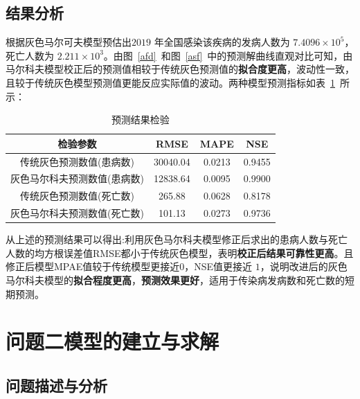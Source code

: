 \documentclass{whutmod}
\begin{document}
   \subsection{结果分析}


	根据灰色马尔可夫模型预估出$ 2019$ 年全国感染该疾病的发病人数为 $7.4096\times  10^{5}$，死亡人数为 $2.211\times  10^{3}
	$。由图~\ref{afd}~和图~\ref{asf}~中的预测解曲线直观对比可知，由马尔科夫模型校正后的预测值相较于传统灰色预测值的\textbf{拟合度更高}，波动性一致，且较于传统灰色模型预测值更能反应实际值的波动。两种模型预测指标如表~\ref{jjj}~所示：

 \begin{table}[H]
	\centering\caption{预测结果检验}\label{jjj}
	\begin{tabular}{cccc}
		\toprule[1.5pt]
		\multicolumn{1}{m{6cm}}{\centering 检验参数}
		& \multicolumn{1}{m{2cm}}{\centering RMSE}
		& \multicolumn{1}{m{2cm}}{\centering MAPE}
		& \multicolumn{1}{m{2cm}}{\centering NSE}
		\\
			\midrule[0.5pt]	
	    传统灰色预测数值(患病数) &   30040.04 &  0.0213 & 0.9455\\ 
		灰色马尔科夫预测数值(患病数)&  12838.64  &  0.0095  &  0.9900 \\ 
		传统灰色预测数值(死亡数) &  265.88   & 0.0628   &0.8178  \\
		灰色马尔科夫预测数值(死亡数) &   101.13 &   0.0273 & 0.9736  \\   
		\bottomrule[1.5pt]	
	\end{tabular}
\end{table} 

从上述的预测结果可以得出:利用灰色马尔科夫模型修正后求出的患病人数与死亡人数的均方根误差值RMSE都小于传统灰色模型，表明\textbf{校正后结果可靠性更高}。且修正后模型MPAE值较于传统模型更接近$0$，NSE值更接近 $1$，说明改进后的灰色马尔科夫模型的\textbf{拟合程度更高}，\textbf{预测效果更好}，适用于传染病发病数和死亡数的短期预测。


	  
	  \section{问题二模型的建立与求解}
	  \subsection{问题描述与分析}
\end{document}

